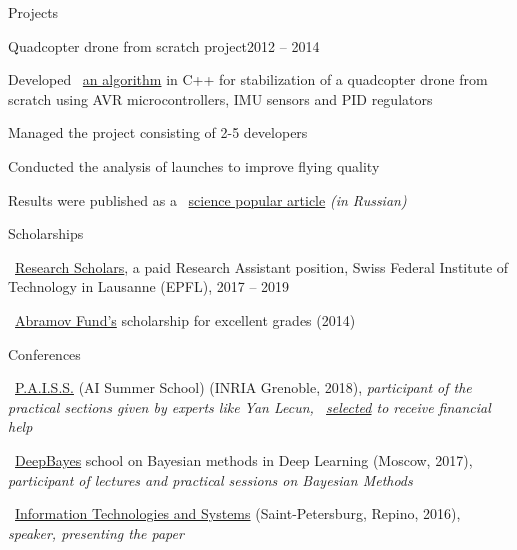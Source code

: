 \documentclass{resume} %
\begin{document}
\begin{rSection}{Projects}
	\begin{rSubsection}{Quadcopter drone from scratch project}{2012 -- 2014}{}{}
		\item Developed \faExternalLink~\href{https://github.com/it-workshop/Quadrocopter}{an algorithm} in C++ for stabilization of a quadcopter drone from scratch using AVR microcontrollers, IMU sensors and PID regulators
		\item Managed the project consisting of 2-5 developers
		\item Conducted the analysis of launches to improve flying quality
		\item Results were published as a \faExternalLink~\href{http://web.archive.org/web/20141016114551/http://habrahabr.ru/company/technoworks/blog/216437/}{science popular article} {\em (in Russian)}
	\end{rSubsection}
\end{rSection}

\begin{rSection}{Scholarships}
	\vspace{-1em}
	\item \faExternalLink~\href{https://ic.epfl.ch/ResearchScholars}{Research Scholars}, a paid Research Assistant position, Swiss Federal Institute of Technology in Lausanne (EPFL), 2017 -- 2019
	\item \faExternalLink~\href{http://phystech-foundation.org/}{Abramov Fund's} scholarship for excellent grades (2014)
\end{rSection}

\begin{rSection}{Conferences}
\vspace{-1em}
\item \faExternalLink~\href{https://project.inria.fr/paiss/}{P.A.I.S.S.} (AI Summer School) (INRIA Grenoble, 2018){, \em participant of the practical sections given by experts like Yan Lecun, \faExternalLink~\href{http://www.europe.naverlabs.com/Blog/Students-at-PAISS}{selected} to receive financial help }
\item \faExternalLink~\href{http://deepbayes.ru}{DeepBayes} school on Bayesian methods in Deep Learning (Moscow, 2017){, \em participant of lectures and practical sessions on Bayesian Methods}
\item \faExternalLink~\href{http://iitp.ru/en/conferences/itas}{Information Technologies and Systems} (Saint-Petersburg, Repino, 2016){, \em speaker, presenting the paper}
\end{rSection}
\end{document}
